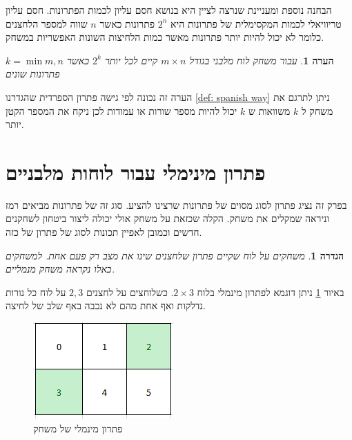 \documentclass[12pt,twoside]{article}
\newtheorem{definition}{הגדרה}[section]
\newtheorem{comm}{הערה}[section]
\begin{document}
הבחנה נוספת ומעניינת שנרצה לציין היא בנושא חסם עליון לכמות הפתרונות.
חסם עליון טריוויאלי לכמות המקסימלית של פתרונות היא 
$2^n$
פתרונות כאשר
$n$
שווה למספר הלחצנים כלומר לא יכול להיות יותר פתרונות מאשר כמות הלחיצות השונות האפשריות במשחק.

\begin{comm}
    עבור משחק לוח מלבני
    בגודל 
    $m \times n$
    קיים לכל יותר 
    $2^k$
    כאשר 
    $k = \min{m,n}$
    פתרונות שונים
\end{comm}
הערה זה נכונה לפי גישה פתרון הספרדית
שהגדרנו
\ref{def: spanish way}
ניתן לתרגם את משחק ל
$k$
משוואות 
ש
$k$
יכול להיות מספר שורות או עמודות 
לכן ניקח את המספר הקטן יותר.


\section{פתרון מינימלי עבור לוחות מלבניים}
בפרק זה נציג פתרון לסוג מסוים של פתרונות שרצינו להציע. סוג זה של פתרונות 
מביאים רמז וניראה שמקלים את משחק. הקלה שכזאת על משחק אולי 
יכולה ליצור ביטחון לשחקנים חדשים וכמובן לאפיין תכונות לסוג של פתרון של כזה.

\begin{definition}
משחקים על לוח שקיים פתרון שלחצנים 
שינו את מצב רק פעם אחת.
למשחקים כאלו נקראה משחק מנמליים.
\end{definition}

באיור 
\ref{fig: min sol 2x3}
ניתן דוגמא לפתרון מינמלי 
בלוח 
$2 \times 3$.
כשלוחצים על לחצנים 
$2, 3$
על לוח כל נורות נדלקות ואף 
אחת מהם לא נכבה באף שלב של לחיצה.

\begin{figure}[ht]
    \caption{פתרון מינמלי של משחק}
    \label{fig: min sol 2x3}
    \centering
    \includegraphics[width=.7\textwidth,height=.7\textheight,keepaspectratio]{images/min_sol_2x3.PNG}
\end{figure}
\end{document}
